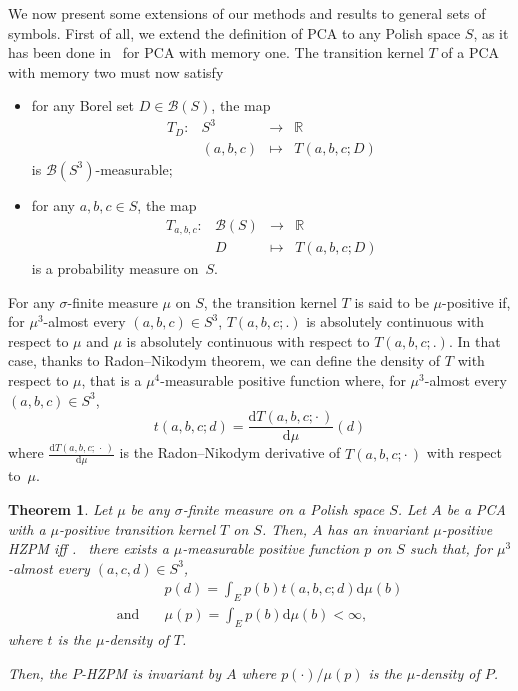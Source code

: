 \documentclass[10pt]{amsart}
\newtheorem{theo}{Theorem}[section]
\theoremstyle{definition}\newtheorem{defi}[theo]{Definition}\newtheorem{rema}[theo]{Remark}\newtheorem{exam}[theo]{Example}\newtheorem{exem}[theo]{Example}\newtheorem{nota}[theo]{Notation}
\newcounter{a}
\newenvironment{cond}{\refstepcounter{a}{\upshape\emph{Cond.~\thea}}\pointir}{}
\newcommand{\app}[5]{\begin{array}{rccl} #1:&#2&\longrightarrow &#3\\ &#4&\longmapsto &#5\end{array}}
\newcommand{\diff}[1]{\mathrm{d} #1}
\newcommand{\borel}[1]{\mathcal{B}\left(#1 \right)}
\newcommand{\RR}{\mathbb{R}}
\providecommand{\pointir}{.\ }
\begin{document}
We now present some extensions of our methods and results to general sets of symbols. First of all, we extend the definition of PCA to any Polish space $S$, as it has been done in~\cite{Casse16} for PCA with memory one. The transition kernel $T$ of a PCA with memory two must now satisfy
\begin{itemize}
\item for any Borel set $D \in \borel{S}$, the map
\[
\app{T_D}{S^3}{\RR}{(a,b,c)}{T(a,b,c;D)}
\]
is $\mathcal{B}(S^3)$-measurable;
\item for any $a,b,c\in S$, the map
\[
\app{T_{a,b,c}}{\borel{S}}{\RR}{D}{T(a,b,c;D)}
\]
is a probability measure on~$S$.
\end{itemize}

For any $\sigma$-finite measure $\mu$ on $S$, the transition kernel $T$ is said to be $\mu$-positive if, for $\mu^3$-almost every $(a,b,c)\in S^3$, $T(a,b,c;.)$ is absolutely continuous with respect to $\mu$ and $\mu$ is absolutely continuous with respect to $T(a,b,c;.)$. In that case, thanks to Radon--Nikodym theorem, we can define the density of $T$ with respect to $\mu$, that is a $\mu^4$-measurable positive function where, for $\mu^3$-almost every $(a,b,c)\in S^3$,
\begin{equation*}
t(a,b,c;d) = \frac{\text{d} T(a,b,c;\cdot\,)}{\text{d} \mu}(d)
\end{equation*}
where $ \frac{\text{d} T(a,b,c;\,\cdot\,)}{\text{d} \mu}$ is the Radon--Nikodym derivative of $T(a,b,c;\cdot\,)$ with respect to~$\mu$.

\begin{theo}
Let $\mu$ be any $\sigma$-finite measure on a Polish space $S$. Let $A$ be a PCA with a $\mu$-positive transition kernel $T$ on $S$. Then, $A$ has an invariant $\mu$-positive HZPM iff
\begin{cond} \label{cond:HZPM-polonais}
there exists a $\mu$-measurable positive function $p$ on $S$ such that, for $\mu^3$-almost every $(a,c,d) \in S^3$,
\begin{align*}
& p(d) = \int_E p(b) t(a,b,c;d) \diff{\mu(b)}\\ \text{and}\quad
& \mu(p) = \int_E p(b) \diff{\mu(b)} < \infty,
\end{align*}
where $t$ is the $\mu$-density of $T$.
\end{cond}

Then, the $P$-HZPM is invariant by $A$ where $p(\cdot)/\mu(p)$ is the $\mu$-density of $P$.
\end{theo}
\goodbreak
\end{document}

